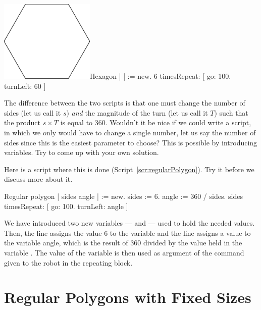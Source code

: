 \begin{scriptfigwithsize}[.5]{\includegraphics[width=4.5cm]{varFHexagon}}{Hexagon}
| \caro |
\caro := \Turtle new.
6 timesRepeat: 
               [ \caro go: 100.
               \caro turnLeft: 60 ]
\end{scriptfigwithsize}

The difference between the two scripts is that one must change the
number of sides (let us call it $s$) \emph{and} the magnitude of the
turn (let us call it $T$) such that the product $s\times T$ is equal
to 360. Wouldn't it be nice if we could write a script, in which we
only would have to change a single number, let us say the number of
sides since this is the easiest parameter to choose?  This is possible
by introducing variables. Try to come up with your own solution.  




Here is a script where this is done (Script~\ref{scr:regularPolygon}). Try it
before we discuss more about it. 

\begin{scriptwithtitle}{Regular polygon}\label{scr:regularPolygon}
| \caro sides angle |
\caro := \Turtle new.
sides := 6.
angle := 360 / sides.
sides timesRepeat: 
                  [ \caro go: 100.
                  \caro turnLeft: angle ]
\end{scriptwithtitle}

We have introduced two new
variables ---  and  --- used to hold
the needed values. Then, the line  assigns the
value 6 to the variable  and the line  assigns a value to the variable angle, which is
the result of 360 divided by the value held in the variable
. The value of the variable  is then
used as argument of the command \turnLeft given to
the robot in the repeating block.


\section{Regular Polygons with Fixed Sizes}

